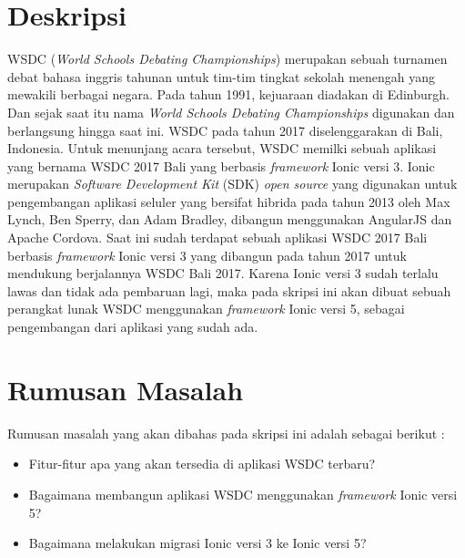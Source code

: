 \documentclass[a4paper,twoside]{article}
\begin{document}
\title{\@judultopik}
\author{\nama \textendash \@npm} 

\newcommand{\nama}{Rajasa Cikal Maulana Solihin}
\newcommand{\@npm}{2017730084}
\newcommand{\@judultopik}{Pembuatan Ulang Aplikasi WSDC 2017 Bali dengan Ionic 5} %
\newcommand{\jumpemb}{1} %
\newcommand{\tanggal}{01/01/1900}


\maketitle


\section{Deskripsi}
WSDC ({\it World Schools Debating Championships}) merupakan sebuah turnamen debat bahasa inggris tahunan untuk tim-tim tingkat sekolah menengah yang mewakili berbagai negara. Pada tahun 1991, kejuaraan diadakan di Edinburgh. Dan sejak saat itu nama {\it World Schools Debating Championships} digunakan dan berlangsung hingga saat ini. WSDC pada tahun 2017 diselenggarakan di Bali, Indonesia. Untuk menunjang acara tersebut, WSDC memilki sebuah aplikasi yang bernama WSDC 2017 Bali yang berbasis {\it framework} Ionic versi 3. Ionic merupakan {\it Software Development Kit} (SDK) {\it open source} yang digunakan untuk pengembangan aplikasi seluler yang bersifat hibrida pada tahun 2013 oleh Max Lynch, Ben Sperry, dan Adam Bradley, dibangun menggunakan AngularJS dan Apache Cordova. Saat ini sudah terdapat sebuah aplikasi WSDC 2017 Bali berbasis {\it framework} Ionic versi 3 yang dibangun pada tahun 2017 untuk mendukung berjalannya WSDC Bali 2017. Karena Ionic versi 3 sudah terlalu lawas dan tidak ada pembaruan lagi, maka pada skripsi ini akan dibuat sebuah perangkat lunak WSDC menggunakan {\it framework} Ionic versi 5, sebagai pengembangan dari aplikasi yang sudah ada. 

\section{Rumusan Masalah}
Rumusan masalah yang akan dibahas pada skripsi ini adalah sebagai berikut :
\begin{itemize}
	\item Fitur-fitur apa yang akan tersedia di aplikasi WSDC terbaru?
	\item Bagaimana membangun aplikasi WSDC menggunakan {\it framework} Ionic versi 5?
	\item Bagaimana melakukan migrasi Ionic versi 3 ke Ionic versi 5?
\end{itemize}
\end{document}
